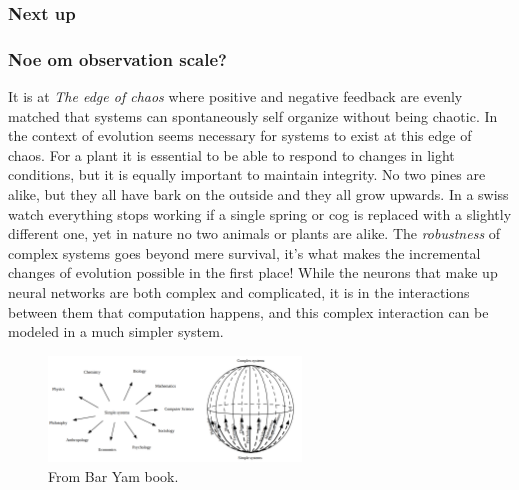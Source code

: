 %
\subsubsection{Next up}
\subsubsection{Noe om observation scale?}
It is at \emph{The edge of chaos} where positive and negative feedback are
evenly matched that systems can spontaneously self organize without being chaotic.
%
In the context of evolution seems necessary for systems to exist at this edge of
chaos.
For a plant it is essential to be able to respond to changes in light
conditions, but it is equally important to maintain integrity.
No two pines are alike, but they all have bark on the outside and they all grow
upwards.
In a swiss watch everything stops working if a single spring or cog is replaced
with a slightly different one, yet in nature no two animals or plants are alike.
The \emph{robustness} of complex systems goes beyond mere survival, it's what
makes the incremental changes of evolution possible in the first place!
%
While the neurons that make up neural networks are both complex and complicated,
it is in the interactions between them that computation happens, and this
complex interaction can be modeled in a much simpler system.
\par
\begin{figure}[h!]
  \centering
  \includegraphics[width=0.6\textwidth]{fig/BarYamCX.png}
  \caption{From Bar Yam book.}
  \label{figCX}
\end{figure}
